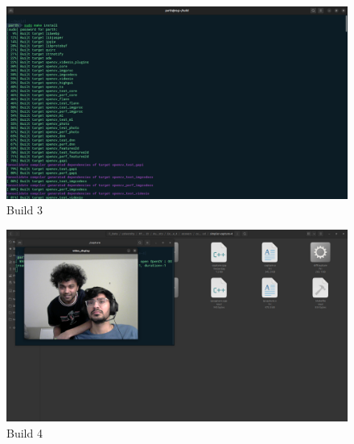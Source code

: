\documentclass[a4paper,11pt]{article}%
\newenvironment{qanda}{\setlength{\parindent}{0pt}}{\bigskip}
\begin{document}
\begin{qanda}
\begin{enumerate}
\begin{figure}[H]
			\end{figure}
			\begin{figure}[H]
				\centering
				\includegraphics[scale=0.25]{figures/build3.png}
				\caption{Build 3}
			\end{figure}
			\begin{figure}[H]
				\centering
				\includegraphics[scale=0.25]{figures/continuous_capture.png}
				\caption{Build 4}
			\end{figure}


\end{enumerate}
\end{qanda}
\end{document}
